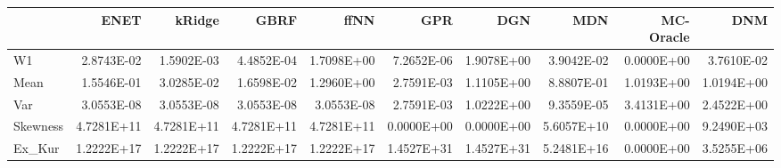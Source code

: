 \begin{tabular}{lrrrrrrrrr}
\toprule
{} &       ENET &     kRidge &       GBRF &       ffNN &        GPR &        DGN &        MDN &  MC-Oracle &        DNM \\
\midrule
W1       & 2.8743E-02 & 1.5902E-03 & 4.4852E-04 & 1.7098E+00 & 7.2652E-06 & 1.9078E+00 & 3.9042E-02 & 0.0000E+00 & 3.7610E-02 \\
Mean     & 1.5546E-01 & 3.0285E-02 & 1.6598E-02 & 1.2960E+00 & 2.7591E-03 & 1.1105E+00 & 8.8807E-01 & 1.0193E+00 & 1.0194E+00 \\
Var      & 3.0553E-08 & 3.0553E-08 & 3.0553E-08 & 3.0553E-08 & 2.7591E-03 & 1.0222E+00 & 9.3559E-05 & 3.4131E+00 & 2.4522E+00 \\
Skewness & 4.7281E+11 & 4.7281E+11 & 4.7281E+11 & 4.7281E+11 & 0.0000E+00 & 0.0000E+00 & 5.6057E+10 & 0.0000E+00 & 9.2490E+03 \\
Ex\_Kur   & 1.2222E+17 & 1.2222E+17 & 1.2222E+17 & 1.2222E+17 & 1.4527E+31 & 1.4527E+31 & 5.2481E+16 & 0.0000E+00 & 3.5255E+06 \\
\bottomrule
\end{tabular}
